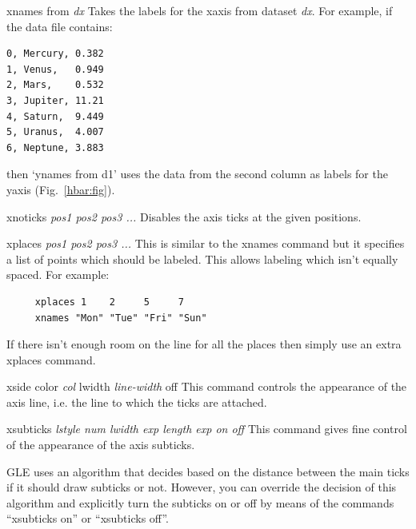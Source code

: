 \begin{commanddescription}
\item[{\sf xnames from {\it dx}}]
Takes the labels for the xaxis from dataset {\it dx}. For example, if the data file contains:

\begin{Verbatim}
0, Mercury, 0.382
1, Venus,   0.949
2, Mars,    0.532
3, Jupiter, 11.21
4, Saturn,  9.449
5, Uranus,  4.007
6, Neptune, 3.883
\end{Verbatim}

\noindent{}then `{\sf ynames from d1}' uses the data from the second column as labels for the yaxis (Fig.~\ref{hbar:fig}).

\item[{\sf xnoticks {\it pos1 pos2 pos3 ...}}]
Disables the axis ticks at the given positions.

\item[{\sf xplaces {\it pos1 pos2 pos3 ...}}  ]
This is similar to the xnames command but it specifies a list of points
which should be labeled.  This allows labeling which isn't equally
spaced. For example:

\begin{Verbatim}
     xplaces 1    2     5     7
     xnames "Mon" "Tue" "Fri" "Sun"
\end{Verbatim}

If there isn't enough room on the line for all the places then simply
use an extra {\sf xplaces} command.

\item[{\sf xside color {\it col} lwidth {\it line-width} off  } ]
This command controls the appearance of the axis line, i.e. the line
to which the ticks are attached.

\item[{\sf xsubticks {\it {\sf lstyle} num  {\sf lwidth} exp {\sf length} exp  {\sf on} {\sf off}}} ]
This command gives fine control of the appearance of the axis subticks.

GLE uses an algorithm that decides based on the distance between the main ticks if it should draw subticks or not. However, you can override the decision of this algorithm and explicitly turn the subticks on or off by means of the commands ``xsubticks on'' or ``xsubticks off''.


\end{commanddescription}
